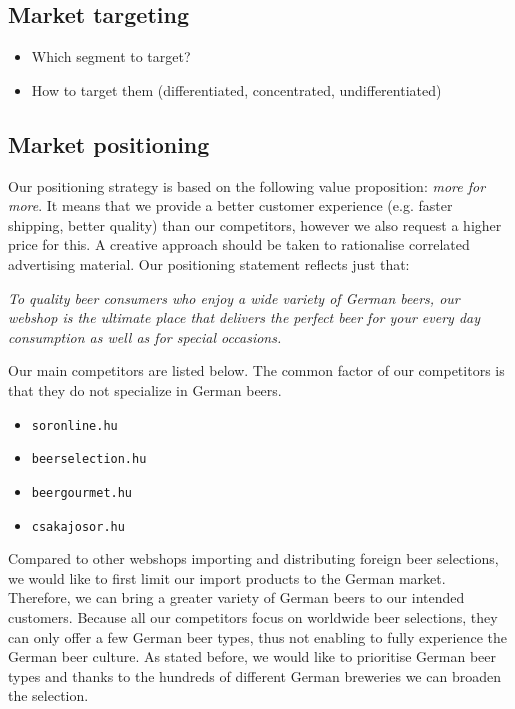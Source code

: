 \subsection{Market targeting}

\begin{itemize}
   \item Which segment to target?
   \item How to target them (differentiated, concentrated, undifferentiated)
\end{itemize}

\subsection{Market positioning}


Our positioning strategy is based on the following value proposition:  \textit{more for more}. It means that we provide a better customer experience (e.g. faster shipping, better quality) than our competitors, however we also request a higher price for this. A creative approach should be taken to rationalise correlated advertising material. Our positioning statement reflects just that:

\textit{To quality beer consumers who enjoy a wide variety of German beers, our webshop is the ultimate place that delivers the perfect beer for your every day consumption as well as for special occasions.}



Our main competitors are listed below. The common factor of our competitors is that they do not specialize in German beers.
\begin{itemize}
   \item \texttt{soronline.hu} \cite{soronline}
   \item \texttt{beerselection.hu} \cite{beerselection}
   \item \texttt{beergourmet.hu} \cite{beergourmet}
   \item \texttt{csakajosor.hu} \cite{csakajosor}
\end{itemize}
Compared to other webshops importing and distributing foreign beer selections, we would like to first limit our import products to the German market. Therefore, we can bring a greater variety of German beers to our intended customers. Because all our competitors focus on worldwide beer selections, they can only offer a few German beer types, thus not enabling to fully experience the German beer culture. As stated before, we would like to prioritise German beer types and thanks to the hundreds of different German breweries we can broaden the selection.

